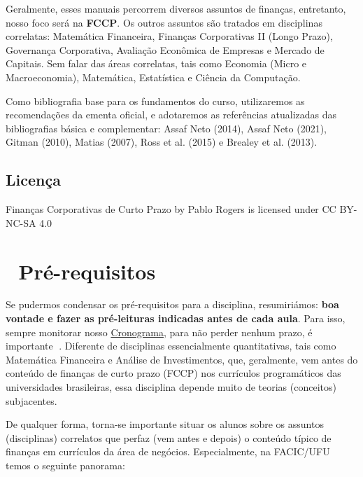 \documentclass[
  a4paper,
]{book}
\begin{document}
Geralmente, esses manuais percorrem diversos assuntos de finanças,
entretanto, nosso foco será na \textbf{FCCP}. Os outros assuntos são
tratados em disciplinas correlatas: Matemática Financeira, Finanças
Corporativas II (Longo Prazo), Governança Corporativa, Avaliação
Econômica de Empresas e Mercado de Capitais. Sem falar das áreas
correlatas, tais como Economia (Micro e Macroeconomia), Matemática,
Estatística e Ciência da Computação.

Como bibliografia base para os fundamentos do curso, utilizaremos as
recomendações da ementa oficial, e adotaremos as referências atualizadas
das bibliografias básica e complementar: Assaf Neto (2014), Assaf Neto
(2021), Gitman (2010), Matias (2007), Ross et al. (2015) e Brealey et
al. (2013).

\section*{Licença}\label{licenuxe7a}


Finanças Corporativas de Curto Prazo by Pablo Rogers is licensed under
CC BY-NC-SA 4.0


\chapter*{🔑 Pré-requisitos}\label{sec-prework}


Se pudermos condensar os pré-requisitos para a disciplina, resumiriámos:
\textbf{boa vontade e fazer as pré-leituras indicadas antes de cada
aula}. Para isso, sempre monitorar nosso
\href{http://fccp.phdpablo.com/00-schedule.html}{Cronograma}, para não
perder nenhum prazo, é importante 🤢. Diferente de disciplinas
essencialmente quantitativas, tais como Matemática Financeira e Análise
de Investimentos, que, geralmente, vem antes do conteúdo de finanças de
curto prazo (FCCP) nos currículos programáticos das universidades
brasileiras, essa disciplina depende muito de teorias (conceitos)
subjacentes.

De qualquer forma, torna-se importante situar os alunos sobre os
assuntos (disciplinas) correlatos que perfaz (vem antes e depois) o
conteúdo típico de finanças em currículos da área de negócios.
Especialmente, na FACIC/UFU temos o seguinte panorama:
\end{document}
